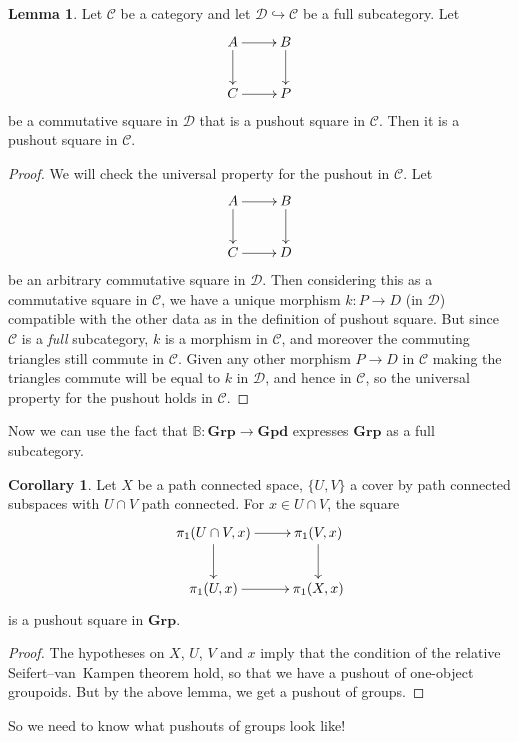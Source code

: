 \documentclass{tufte-handout}
\def\into {\hookrightarrow}
\def\cC {\mathcal{C}}
\def\cD {\mathcal{D}}
\def\Grp {\mathbf{Grp}}
\def\Gpd {\mathbf{Gpd}}
\theoremstyle{definition}
\newtheorem{lemma}{Lemma}
\newtheorem{corollary}{Corollary}
\begin{document}
\begin{lemma}
Let $\cC$ be a category and let $\cD \into \cC$ be a full subcategory. Let
\[
\xymatrix{
	A\ar[r] \ar[d] & B \ar[d]\\
	C \ar[r] & P
}
\]
be a commutative square in $\cD$ that is a pushout square in $\cC$. Then it is a pushout
square in $\cC$.
\end{lemma}

\begin{proof}
We will check the universal property for the pushout in $\cC$. Let
\[
\xymatrix{
	A\ar[r] \ar[d] & B \ar[d] \\
	C \ar[r] & D
}
\]
be an arbitrary commutative square in $\cD$. Then considering this as a commutative 
square in $\cC$, we have a unique morphism $k\colon P\to D$ (in $\cD$) compatible with 
the other data as in the definition of pushout square. But since $\cC$ is a \emph{full} 
subcategory, $k$ is a morphism in $\cC$, and moreover the commuting triangles still 
commute in $\cC$. Given any other morphism $P\to D$ in $\cC$ making the triangles commute will
be equal to $k$ in $\cD$, and hence in $\cC$, so the universal property for the pushout
holds in $\cC$.
\end{proof}

Now we can use the fact that $\mathbb{B}\colon \Grp \to \Gpd$ expresses $\Grp$ as a full 
subcategory.

\begin{corollary}
Let $X$ be a path connected space, $\{U,V\}$ a cover by path connected subspaces with 
$U\cap V$ path connected. For $x\in U\cap V$, the square
\[
\xymatrix{
	\pi_1(U\cap V,x) \ar[r] \ar[d] & \pi_1(V,x) \ar[d]\\
	\pi_1(U,x) \ar[r] & \pi_1(X,x)
}
\]
is a pushout square in $\Grp$.
\end{corollary}

\begin{proof}
The hypotheses on $X$, $U$, $V$ and $x$ imply that the condition of the relative 
Seifert--van~Kampen theorem hold, so that we have a pushout of one-object groupoids. But 
by the above lemma, we get a pushout of groups.
\end{proof}

So we need to know what pushouts of groups look like!
\end{document}

